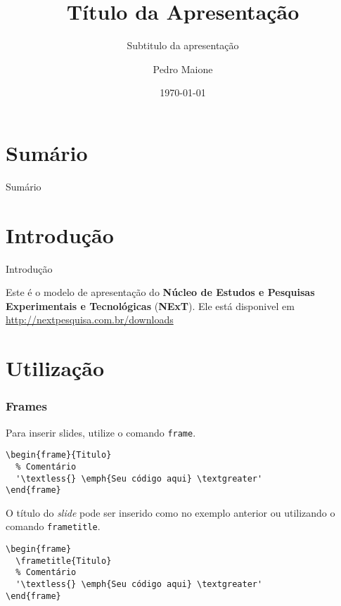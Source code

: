\documentclass[10pt,aspectratio=43,xcolor,compress]{beamer}
\title{Título da Apresentação}
\subtitle{Subtitulo da apresentação}
\date{\today}
\author{Pedro Maione}
\institute{\NExT}
\newcommand{\NExT}{Núcleo de Estudos e Pesquisas Experimentais e Tecnológicas}
\begin{document}

\maketitle

\section*{Sumário}
\begin{frame}{Sumário}
  \tableofcontents[hideallsubsections]
\end{frame}

\section{Introdução}

\begin{frame}{Introdução}

  Este é o modelo de apresentação do \textbf{\NExT} (\textbf{NExT}).
  Ele está disponivel em \url{http://nextpesquisa.com.br/downloads}

\end{frame}

\section{Utilização}

\begin{frame}[containsverbatim]
  \frametitle{Frames}

  Para inserir slides, utilize o comando \lstinline|frame|.

\begin{lstlisting}[style=customlatex]
\begin{frame}{Titulo}
  % Comentário
  '\textless{} \emph{Seu código aqui} \textgreater'
\end{frame}
\end{lstlisting}

  O título do \emph{slide} pode ser inserido como no exemplo anterior ou utilizando o comando \lstinline|frametitle|.

\begin{lstlisting}[style=customlatex]
\begin{frame}
  \frametitle{Titulo}
  % Comentário
  '\textless{} \emph{Seu código aqui} \textgreater'
\end{frame}
\end{lstlisting}

\end{frame}
\end{document}
